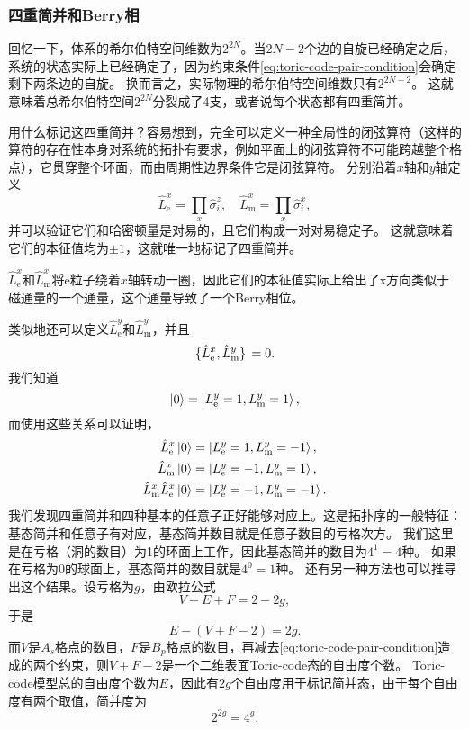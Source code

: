 \documentclass[hyperref, UTF8, a4paper]{ctexart}
\begin{document}
\subsubsection{四重简并和Berry相}

回忆一下，体系的希尔伯特空间维数为$2^{2N}$。当$2N-2$个边的自旋已经确定之后，系统的状态实际上已经确定了，因为约束条件\eqref{eq:toric-code-pair-condition}会确定剩下两条边的自旋。
换而言之，实际物理的希尔伯特空间维数只有$2^{2N-2}$。
这就意味着总希尔伯特空间$2^{2N}$分裂成了4支，或者说每个状态都有四重简并。

用什么标记这四重简并？容易想到，完全可以定义一种全局性的闭弦算符（这样的算符的存在性本身对系统的拓扑有要求，例如平面上的闭弦算符不可能跨越整个格点），它贯穿整个环面，而由周期性边界条件它是闭弦算符。
分别沿着$x$轴和$y$轴定义
\begin{equation}
    \hat{L}^x_\text{e} = \prod_{x} \hat{\sigma}^z_i, \quad \hat{L}^x_\text{m} = \prod_{x} \hat{\sigma}^x_i,
\end{equation}
并可以验证它们和哈密顿量是对易的，且它们构成一对对易稳定子。
这就意味着它们的本征值均为$\pm 1$，这就唯一地标记了四重简并。

$\hat{L}^x_\text{e}$和$\hat{L}^x_\text{m}$将e粒子绕着$x$轴转动一圈，因此它们的本征值实际上给出了x方向类似于磁通量的一个通量，这个通量导致了一个Berry相位。

类似地还可以定义$\hat{L}^y_\text{e}$和$\hat{L}^y_\text{m}$，并且
\begin{equation}
    \acomm*{\hat{L}^x_\text{e}}{\hat{L}^y_\text{m}} = 0.
\end{equation}
我们知道
\begin{equation}
    \ket{0} = \ket{L_\text{e}^y=1, L_\text{m}^y=1},
\end{equation}
而使用这些关系可以证明，
\begin{equation}
    \begin{aligned}
        \hat{L}^x_\text{e} \ket{0} &= \ket{L_\text{e}^y=1, L_\text{m}^y=-1}, \\
        \hat{L}^x_\text{m} \ket{0} &= \ket{L_\text{e}^y=-1, L_\text{m}^y=1}, \\
        \hat{L}^x_\text{m} \hat{L}^x_\text{e} \ket{0} &= \ket{L_\text{e}^y=-1, L_\text{m}^y=-1}.
    \end{aligned}
\end{equation}
我们发现四重简并和四种基本的任意子正好能够对应上。这是拓扑序的一般特征：基态简并和任意子有对应，基态简并数目就是任意子数目的亏格次方。
我们这里是在亏格（洞的数目）为1的环面上工作，因此基态简并的数目为$4^1=4$种。
如果在亏格为0的球面上，基态简并的数目就是$4^0=1$种。
还有另一种方法也可以推导出这个结果。设亏格为$g$，由欧拉公式
\[
    V - E + F = 2 - 2g,
\]
于是
\[
    E - (V + F - 2) = 2g.
\]
而$V$是$A_s$格点的数目，$F$是$B_p$格点的数目，再减去\eqref{eq:toric-code-pair-condition}造成的两个约束，则$V+F-2$是一个二维表面Toric-code态的自由度个数。
Toric-code模型总的自由度个数为$E$，因此有$2g$个自由度用于标记简并态，由于每个自由度有两个取值，简并度为
\[
    2^{2g} = 4^g.
\]
\end{document}
